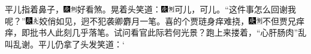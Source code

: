 {平儿指着鼻子，{\includegraphics[width=3mm]{../Images/00004}\includegraphics[width=3mm]{../Images/00011}\footnotesize \kaishu 好看煞。}晃着头笑道：{\includegraphics[width=3mm]{../Images/00004}\includegraphics[width=3mm]{../Images/00011}\footnotesize \kaishu 可儿，可儿。}``这件事怎么回谢我呢？''{\includegraphics[width=3mm]{../Images/00004}\includegraphics[width=3mm]{../Images/00012}\footnotesize \kaishu 姣俏如见，迥不犯袭卿麝月一笔。}喜的个贾琏身痒难挠，{\includegraphics[width=3mm]{../Images/00004}\includegraphics[width=3mm]{../Images/00011}\footnotesize \kaishu 不但贾兄痒痒，即批书人此刻几乎落笔。试问看官此际若何光景？}跑上来搂着，``心肝肠肉''乱叫乱谢。平儿仍拿了头发笑道：`}

